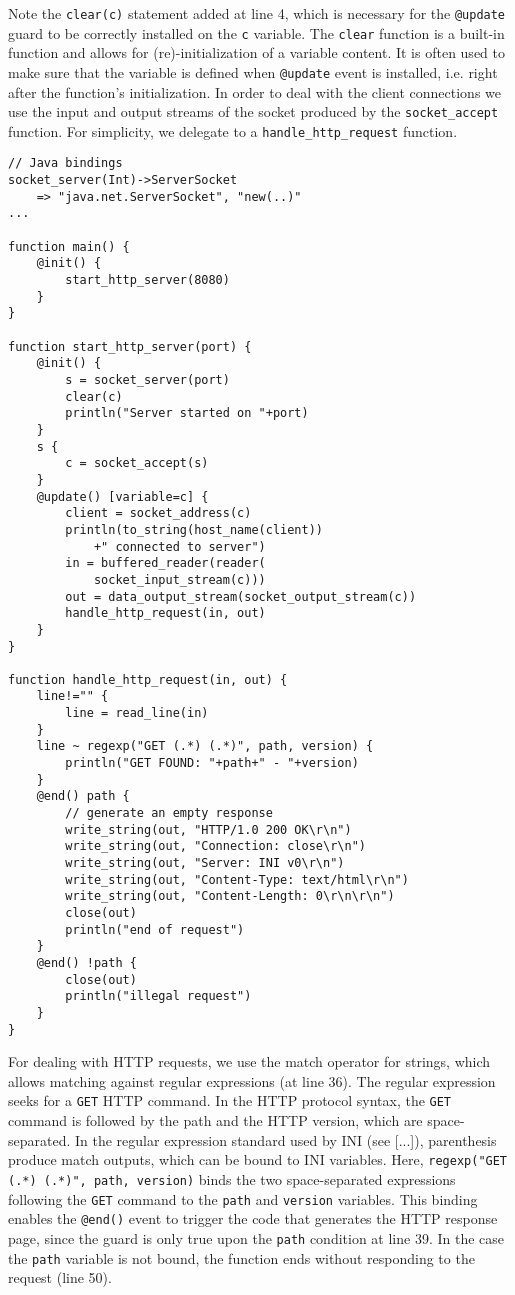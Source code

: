 \documentclass[11pt]{article}
\begin{document}
Note the \texttt{clear(c)} statement added at line 4, which is necessary for the \texttt{@update} guard to be correctly installed on the \texttt{c} variable. The \texttt{clear} function is a built-in function and allows for (re)-initialization of a variable content. It is often used to make sure that the variable is defined when \texttt{@update} event is installed, i.e. right after the function's initialization. In order to deal with the client connections we use the input and output streams of the socket produced by the \texttt{socket\_accept} function. For simplicity, we delegate to a \texttt{handle\_http\_request} function.

\begin{lstlisting}
// Java bindings
socket_server(Int)->ServerSocket
	=> "java.net.ServerSocket", "new(..)"
...
	
function main() {
	@init() {
		start_http_server(8080)
	}
}

function start_http_server(port) {
	@init() {
		s = socket_server(port)
		clear(c)
		println("Server started on "+port)
	}
	s {
		c = socket_accept(s)
	}
	@update() [variable=c] {
		client = socket_address(c)
		println(to_string(host_name(client))
			+" connected to server")
		in = buffered_reader(reader(
			socket_input_stream(c)))
		out = data_output_stream(socket_output_stream(c))
		handle_http_request(in, out)
	}		
}

function handle_http_request(in, out) {
	line!="" {
		line = read_line(in)
	}
	line ~ regexp("GET (.*) (.*)", path, version) {
		println("GET FOUND: "+path+" - "+version)
	}
	@end() path {
		// generate an empty response
		write_string(out, "HTTP/1.0 200 OK\r\n")
		write_string(out, "Connection: close\r\n")
		write_string(out, "Server: INI v0\r\n")
		write_string(out, "Content-Type: text/html\r\n")
		write_string(out, "Content-Length: 0\r\n\r\n")
		close(out)
		println("end of request")
	}
	@end() !path {
		close(out)
		println("illegal request")
	}
}
\end{lstlisting}

For dealing with HTTP requests, we use the match operator for strings, which allows matching against regular expressions (at line 36). The regular expression seeks for a \texttt{GET} HTTP command. In the HTTP protocol syntax, the \texttt{GET} command is followed by the path and the HTTP version, which are space-separated. In the regular expression \cite{friedl2006} standard used by INI (see [...]), parenthesis produce match outputs, which can be bound to INI variables. Here, \texttt{regexp("GET (.*) (.*)", path, version)} binds the two space-separated expressions following the \texttt{GET} command to the \texttt{path} and \texttt{version} variables. This binding enables the \texttt{@end()} event to trigger the code that generates the HTTP response page, since the guard is only true upon the \texttt{path} condition at line 39. In the case the \texttt{path} variable is not bound, the function ends without responding to the request (line 50).
\end{document}
